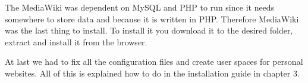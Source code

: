 The MediaWiki was dependent on MySQL and PHP to run since it needs somewhere to store data and because it is written in PHP. Therefore MediaWiki was the last thing to install. To install it you download it to the desired folder, extract and install it from the browser.

At last we had to fix all the configuration files and create user spaces for personal websites. All of this is explained how to do in the installation guide in chapter 3.

